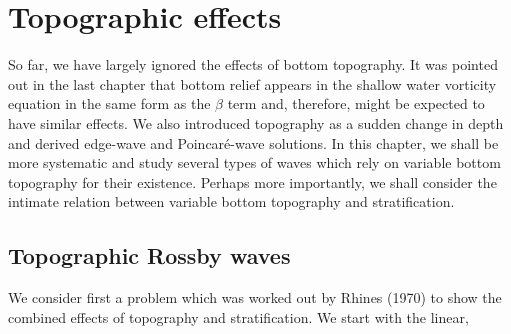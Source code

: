 
\setcounter{chapter}{5}

\chapter{Topographic effects}

So far, we have largely ignored the effects of bottom topography. It was pointed out in
the last chapter that bottom relief appears in the shallow water vorticity equation in
the same form as the $\beta$ term and, therefore, might be expected to have similar
effects. We also introduced topography as a sudden change in depth and derived
edge-wave and Poincaré-wave solutions. In this chapter, we shall be more systematic
and study several types of waves which rely on variable bottom topography for their
existence. Perhaps more importantly, we shall consider the intimate relation between
variable bottom topography and stratification.

\section{Topographic Rossby waves}

We consider first a problem which was worked out by Rhines (1970) to show the combined
effects of topography and stratification. We start with the linear,

\sourcepagebreak

